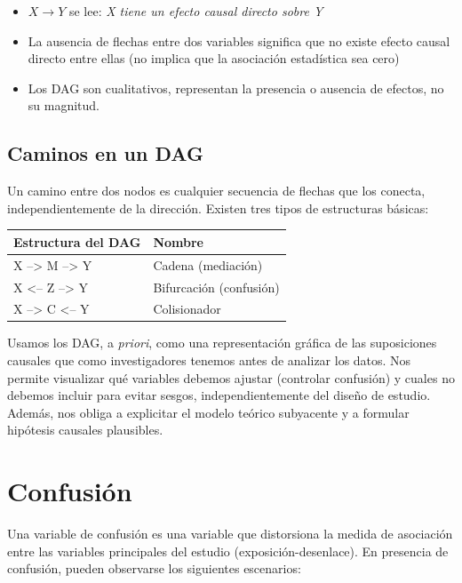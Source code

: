 \documentclass[
  spanish,
  a4paper,
]{scrbook}
\newcounter{none} %
\providecommand{\tightlist}{%
  \setlength{\itemsep}{0pt}\setlength{\parskip}{0pt}}
\begin{document}
\begin{itemize}
\tightlist
\item
  \(X \rightarrow Y\) se lee: \emph{X tiene un efecto causal directo
  sobre Y}
\item
  La ausencia de flechas entre dos variables significa que no existe
  efecto causal directo entre ellas (no implica que la asociación
  estadística sea cero)
\item
  Los DAG son cualitativos, representan la presencia o ausencia de
  efectos, no su magnitud.
\end{itemize}

\subsection{Caminos en un DAG}\label{caminos-en-un-dag}

Un camino entre dos nodos es cualquier secuencia de flechas que los
conecta, independientemente de la dirección. Existen tres tipos de
estructuras básicas:

{\def\LTcaptype{none} %
\begin{longtable}[]{@{}ll@{}}
\toprule\noalign{}
Estructura del DAG & Nombre \\
\midrule\noalign{}
\endhead
\bottomrule\noalign{}
\endlastfoot
X --\textgreater{} M --\textgreater{} Y & Cadena (mediación) \\
X \textless-- Z --\textgreater{} Y & Bifurcación (confusión) \\
X --\textgreater{} C \textless-- Y & Colisionador \\
\end{longtable}
}

Usamos los DAG, a \emph{priori}, como una representación gráfica de las
suposiciones causales que como investigadores tenemos antes de analizar
los datos. Nos permite visualizar qué variables debemos ajustar
(controlar confusión) y cuales no debemos incluir para evitar sesgos,
independientemente del diseño de estudio. Además, nos obliga a
explicitar el modelo teórico subyacente y a formular hipótesis causales
plausibles.

\section{Confusión}\label{confusiuxf3n}

Una variable de confusión es una variable que distorsiona la medida de
asociación entre las variables principales del estudio
(exposición-desenlace). En presencia de confusión, pueden observarse los
siguientes escenarios:
\end{document}
